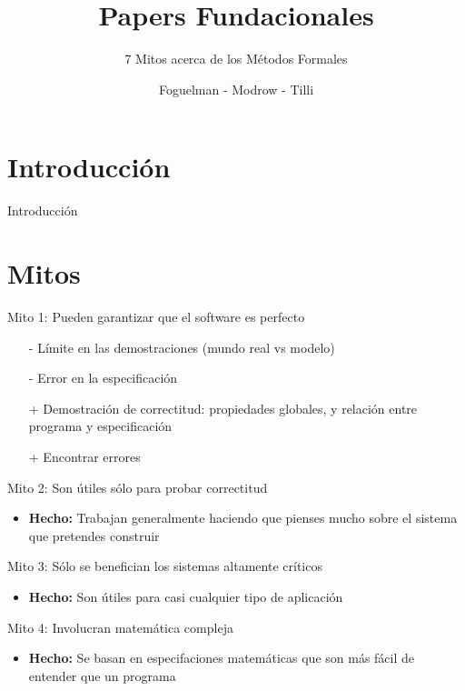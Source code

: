 \documentclass{beamer}
\title{Papers Fundacionales}
\subtitle{7 Mitos acerca de los M\'etodos Formales}
\author{Foguelman - Modrow - Tilli}
\institute{DC - UBA}
\begin{document}
\frame{\titlepage}
\section{Introducci\'on}
\begin{frame}{Introducci\'on}

\end{frame}

\section{Mitos}
\begin{frame}{Mito 1: Pueden garantizar que el software es perfecto }
\begin{itemize}[<+->]
\item[-] L\'imite en las demostraciones (mundo real vs modelo)
\item[-] Error en la especificaci\'on
\item[+] Demostraci\'on de correctitud: propiedades globales, y relaci\'on entre programa y especificaci\'on
\item[+] Encontrar errores
\end{itemize}
\end{frame}

\begin{frame}{Mito 2: Son \'utiles s\'olo para probar correctitud}
\begin{itemize}[<+->]
\item \textbf{Hecho:} Trabajan generalmente haciendo que pienses mucho sobre el sistema que pretendes construir
\end{itemize}
\end{frame}
 
\begin{frame}{Mito 3: S\'olo se benefician los sistemas altamente cr\'iticos} 
\begin{itemize}[<+->]
\item \textbf{Hecho:} Son \'utiles para casi cualquier tipo de aplicaci\'on
\end{itemize}
\end{frame}
 
\begin{frame}{Mito 4: Involucran matem\'atica compleja}
\begin{itemize}[<+->]
\item \textbf{Hecho:} Se basan en especifaciones matem\'aticas que son m\'as f\'acil de entender que un programa
\end{itemize}
\end{frame}
 
\end{document}
